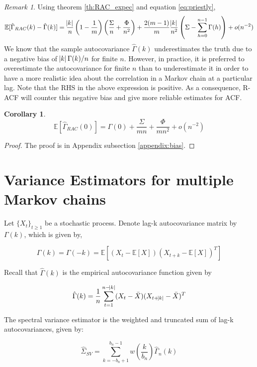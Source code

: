 \documentclass[12pt]{article}
\newcommand{\E}{\mathbb{E}}
\newtheorem{corollary}{Corollary}
\theoremstyle{remark}
\newtheorem{remark}{Remark}
\begin{document}
\begin{remark} \label{rmrk:exp_racf_minus_acf}
Using theorem \ref{th:RAC_expec} and equation \ref{eq:priestly},
\[
\mathbb{E}[\hat{\Gamma}_{RAC}(k) - \hat{\Gamma}(k)] = \dfrac{\abs{k}}{n}\left(1 - \dfrac{1}{m}\right)\left(\dfrac{\Sigma}{n} + \dfrac{\Phi}{n^2}\right) + \dfrac{2(m-1)}{m}\dfrac{\abs{k}}{n^2} \left(\Sigma - \sum_{h=0}^{n-1}\Gamma(h)\right) + o(n^{-2})
\]
We know that the sample autocovariance $\hat{\Gamma}(k)$ underestimates the truth due to a negative bias of $\abs{k}\Gamma(k)/n$ for finite $n$. However, in practice, it is preferred to overestimate the autocovariance for finite $n$ than to underestimate it in order to have a more realistic idea about the correlation in a Markov chain at a particular lag.  Note that the RHS in the above expression is positive. As a consequence, R-ACF will counter this negative bias and give more reliable estimates for ACF. 

\end{remark}

\begin{corollary} \label{cor:lag0_expectation}
\[
\mathbb{E}[\hat{\Gamma}_{RAC}(0)] = \Gamma(0) + \dfrac{\Sigma}{mn} + \dfrac{\Phi}{mn^2} + o(n^{-2})
\]
\end{corollary}

\begin{proof}
 The proof is in Appendix subsection \ref{appendix:bias}.
\end{proof}

\section{Variance Estimators for multiple Markov chains} \label{sec:variance_est}

Let $\{X_t\}_{t \geq 1}$ be a stochastic process. Denote lag-k autocovariance matrix by $\Gamma(k)$, which is given by,

\[
\Gamma(k) = \Gamma(-k) = \E[(X_t - \E[X])(X_{t+k} - \E[X])^T]
\]

Recall that $\hat{\Gamma}(k)$ is the empirical autocovariance function given by 

\[
\hat{\Gamma}(k) = \dfrac{1}{n}\sum_{t=1}^{n-\abs{k}}(X_t - \bar{X})(X_{t + \abs{k}} - \bar{X})^T
\]

The spectral variance estimator is the weighted and truncated sum of lag-k autocovariances, given by:

\[
\hat{\Sigma}_{SV} = \sum_{k=-b_n+1}^{b_n-1}w\left(\dfrac{k}{b_n}\right)\hat{\Gamma}_n(k)
\]
\end{document}
